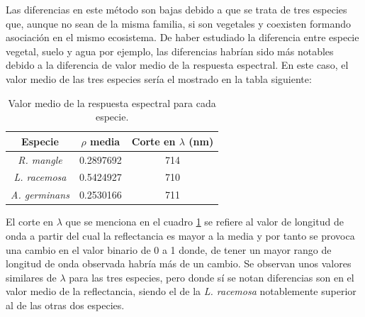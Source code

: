 Las diferencias en este método son bajas debido a que se trata de tres especies que, aunque no sean de la misma familia, si son vegetales y coexisten formando asociación en el mismo ecosistema. De haber estudiado la diferencia entre especie vegetal, suelo y agua por ejemplo, las diferencias habrían sido más notables debido a la diferencia de valor medio de la respuesta espectral. En este caso, el valor medio de las tres especies sería el mostrado en la tabla siguiente:

\begin{table}[ht]
	\centering
	\caption[Valores medios de la respuesta espectral]{Valor medio de la respuesta espectral para cada especie.}
	\begin{tabular}{@{}ccc@{}}
	\toprule[0.4mm]
	Especie & $\rho$ media & Corte en $\lambda$ (nm)\\
	\midrule
	\textit{R. mangle} & 0.2897692 & 714	\\
	\textit{L. racemosa} & 0.5424927 & 710\\
	\textit{A. germinans} & 0.2530166 & 711\\
	\bottomrule
	\end{tabular}
	\label{tab:mediaIAE}
\end{table}

El corte en $\lambda$ que se menciona en el cuadro \ref{tab:mediaIAE} se refiere al valor de longitud de onda a partir del cual la reflectancia es mayor a la media y por tanto se provoca una cambio en el valor binario de 0 a 1 donde, de tener un mayor rango de longitud de onda observada habría más de un cambio. Se observan unos valores similares de $\lambda$ para las tres especies, pero donde sí se notan diferencias son en el valor medio de la reflectancia, siendo el de la \textit{L. racemosa} notablemente superior al de las otras dos especies.

